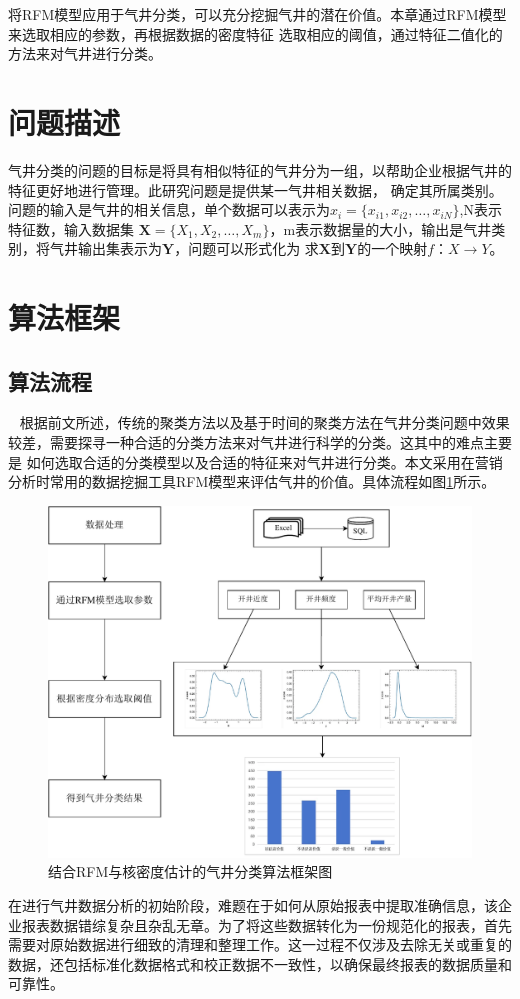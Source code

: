 将RFM模型应用于气井分类，可以充分挖掘气井的潜在价值。本章通过RFM模型来选取相应的参数，再根据数据的密度特征
选取相应的阈值，通过特征二值化的方法来对气井进行分类。
\section{问题描述}
气井分类的问题的目标是将具有相似特征的气井分为一组，以帮助企业根据气井的特征更好地进行管理。此研究问题是提供某一气井相关数据，
确定其所属类别。问题的输入是气井的相关信息，单个数据可以表示为$x_i = \{x_{i1}, x_{i2}, \ldots, x_{iN}\}$,N表示特征数，输入数据集
$\mathbf{X} = \{X_{1}, X_{2}, \ldots, X_{m}\}$，m表示数据量的大小，输出是气井类别，将气井输出集表示为$\mathbf{Y}$，问题可以形式化为
求$\mathbf{X}$到$\mathbf{Y}$的一个映射$f$：$X \rightarrow Y$。
\section{算法框架}
\subsection{算法流程}\
\label{sec:K-Shapeprocess}
根据前文所述，传统的聚类方法以及基于时间的聚类方法在气井分类问题中效果较差，需要探寻一种合适的分类方法来对气井进行科学的分类。这其中的难点主要是
如何选取合适的分类模型以及合适的特征来对气井进行分类。本文采用在营销分析时常用的数据挖掘工具RFM模型来评估气井的价值。具体流程如图\ref{fig:wellcla}所示。
\begin{figure}
    \centering
    \includegraphics[width=.8\linewidth]{figure/气井分类框架图.vision.pdf}
    \caption{结合RFM与核密度估计的气井分类算法框架图}
    \label{fig:wellcla}
\end{figure}
在进行气井数据分析的初始阶段，难题在于如何从原始报表中提取准确信息，该企业报表数据错综复杂且杂乱无章。为了将这些数据转化为一份规范化的报表，首先需要对原始数据进行细致的清理和整理工作。这一过程不仅涉及去除无关或重复的数据，还包括标准化数据格式和校正数据不一致性，以确保最终报表的数据质量和可靠性。


